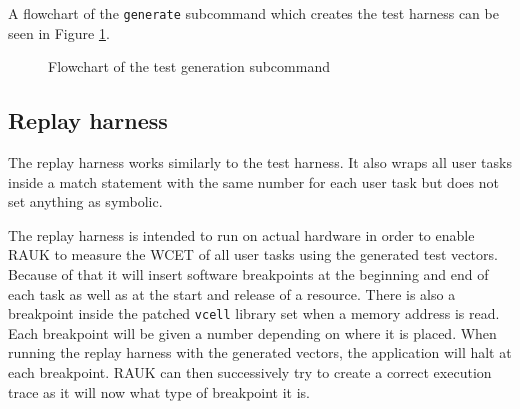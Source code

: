A flowchart of the \texttt{generate} subcommand which creates the test harness
can be seen in Figure \ref{fig:generatecmd}.
\begin{figure}[H]
    \centering
    \caption{Flowchart of the test generation subcommand}
    \label{fig:generatecmd}
\end{figure}

\subsection{Replay harness}
The replay harness works similarly to the test harness. It also wraps all user
tasks inside a match statement with the same number for each user task but
does not set anything as symbolic.

The replay harness is intended to run on actual hardware in order to enable
RAUK to measure the WCET of all user tasks using the generated test vectors.
Because of that it will insert software breakpoints at the beginning and end of
each task as well as at the start and release of a resource. There is also a
breakpoint inside the patched \texttt{vcell} library set when a memory address
is read.  Each breakpoint will be given a number depending on where it is
placed. When running the replay harness with the generated vectors, the
application will halt at each breakpoint. RAUK can then successively try to
create a correct execution trace as it will now what type of breakpoint it is.

